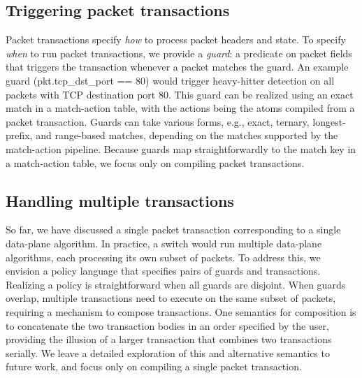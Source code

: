 \subsection{Triggering packet transactions}
\label{ss:guards}
Packet transactions specify \textit{how} to process packet headers and
state.  To specify {\em when} to run packet transactions, we provide a {\em
guard}: a predicate on packet fields that triggers the transaction whenever a
packet matches the guard. An example guard (pkt.tcp\_dst\_port == 80) would
trigger heavy-hitter detection on all packets with TCP destination port 80. This
guard can be realized using an exact match in a match-action table, with the
actions being the atoms compiled from a packet transaction. Guards
can take various forms, e.g., exact, ternary, longest-prefix, and range-based
matches, depending on the matches supported by the match-action
pipeline. Because guards map straightforwardly to the match key in a
match-action table, we focus only on compiling packet transactions.

\subsection{Handling multiple transactions}
\label{ss:multiple}
So far, we have discussed a single packet transaction corresponding to a single
data-plane algorithm. In practice, a switch would run multiple data-plane
algorithms, each processing its own subset of packets. To address this, we
envision a policy language that specifies pairs of guards and transactions.
Realizing a policy is straightforward when all guards are disjoint. When guards
overlap, multiple transactions need to execute on the same subset of packets,
requiring a mechanism to compose transactions. One semantics for composition is
to concatenate the two transaction bodies in an order specified by the user,
providing the illusion of a larger transaction that combines two transactions serially.
We leave a detailed exploration of this and alternative semantics to future
work, and focus only on compiling a single packet transaction.
